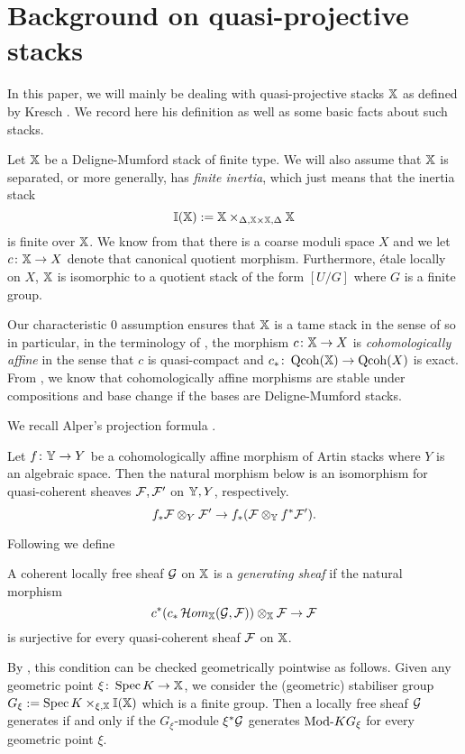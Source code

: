 \documentclass[12pt]{amsart}
\begin{document}
\section{Background on quasi-projective stacks}

In this paper, we will mainly be dealing with quasi-projective stacks $\mathbb{X}$ as defined by Kresch \cite{Kr}. We record here his definition as well as some basic facts about such stacks.

Let $\mathbb{X}$ be a Deligne-Mumford stack of finite type. We will also assume that $\mathbb{X}$ is separated, or more generally, has {\em finite inertia}, which just means that the inertia stack $$\mathbb{I}(\mathbb{X}) :=\mathbb{X} \times_{\Delta,\mathbb{X} \times \mathbb{X} , \Delta} \mathbb{X}$$ 
is finite over $\mathbb{X}$. We know from \cite{KeM} that there is a coarse moduli space $X$ and we let $c\colon \mathbb{X} \to X$ denote that canonical quotient morphism. Furthermore, \'etale locally on $X$, $\mathbb{X}$ is isomorphic to a quotient stack of the form $[U/G]$ where $G$ is a finite group.

Our characteristic 0 assumption ensures that $\mathbb{X}$ is a tame stack in the sense of \cite{AOV} so in particular, in the terminology of \cite[Definition~3.1]{Alp}, the morphism $c \colon \mathbb{X} \to X$ is {\em cohomologically affine} in the sense that $c$ is quasi-compact and $c_* \colon \operatorname{Qcoh}(\mathbb{X}) \to \operatorname{Qcoh} (X)$ is exact.  From \cite[Proposition~3.10]{Alp}, we know that cohomologically affine morphisms are stable under compositions and base change if the bases are Deligne-Mumford stacks. 

We recall Alper's projection formula \cite[Proposition~4.5]{Alp}.
\begin{proposition}   \label{prop:projection}
Let $f \colon \mathbb{Y} \to Y$ be a cohomologically affine morphism of Artin stacks where $Y$ is an algebraic space. Then the natural morphism below is an isomorphism for quasi-coherent sheaves $\mathcal{F}, \mathcal{F}'$ on $\mathbb{Y}, Y$, respectively.
$$ f_* \mathcal{F} \otimes_{Y} \mathcal{F}' \to f_* (\mathcal{F} \otimes_{\mathbb{Y}} f^* \mathcal{F}').$$
\end{proposition}

Following \cite{OS} we define
\begin{definition}
A coherent locally free sheaf $\mathcal{G}$ on $\mathbb{X}$ is a {\em generating sheaf} if the natural morphism
$$ c^*(c_*\mathop{{\mathcal{H}}om}\nolimits_{\mathbb{X}}(\mathcal{G}, \mathcal{F})) \otimes_{\mathbb{X}} \mathcal{F} \to \mathcal{F}$$
is surjective for every quasi-coherent sheaf $\mathcal{F}$ on $\mathbb{X}$. 
\end{definition}
By \cite[Theorem~5.2]{OS}, this condition can be checked geometrically pointwise as follows. Given any geometric point $\xi \colon \operatorname{Spec} K \to \mathbb{X}$, we consider the (geometric) stabiliser group $G_{\xi} := \operatorname{Spec} K \times_{\xi, \mathbb{X}} \mathbb{I}(\mathbb{X})$ which is a finite group. Then a locally free sheaf $\mathcal{G}$ generates if and only if the $G_{\xi}$-module $\xi^* \mathcal{G}$ generates $\textup{Mod-} KG_{\xi}$ for every geometric point $\xi$. 
\end{document}
